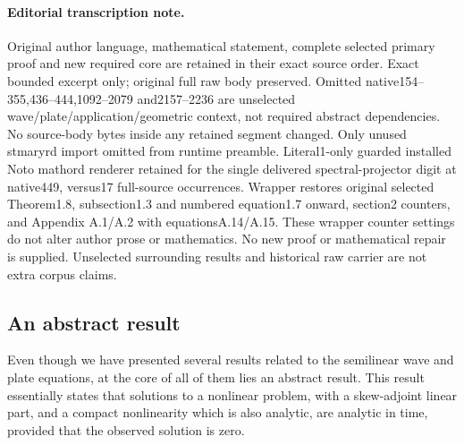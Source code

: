 \documentclass[11pt]{article}
\theoremstyle{definition}
\begin{document}
\paragraph{Editorial transcription note.}
Original author language, mathematical statement, complete selected primary proof and new required core are retained in their exact source order. Exact bounded excerpt only; original full raw body preserved. Omitted native154–355,436–444,1092–2079 and2157–2236 are unselected wave/plate/application/geometric context, not required abstract dependencies. No source-body bytes inside any retained segment changed. Only unused stmaryrd import omitted from runtime preamble. Literal1-only guarded installed Noto mathord renderer retained for the single delivered spectral-projector digit at native449, versus17 full-source occurrences. Wrapper restores original selected Theorem1.8, subsection1.3 and numbered equation1.7 onward, section2 counters, and Appendix A.1/A.2 with equationsA.14/A.15. These wrapper counter settings do not alter author prose or mathematics. No new proof or mathematical repair is supplied. Unselected surrounding results and historical raw carrier are not extra corpus claims.
\clearpage
{}
\setcounter{section}{1}\setcounter{subsection}{2}\setcounter{theorem}{7}\setcounter{equation}{6}

\subsection{An abstract result}\label{s:abstrIntro} Even though we have presented several results related to the semilinear wave and plate equations, at the core of all of them lies an abstract result. This result essentially states that solutions to a nonlinear problem, with a skew-adjoint linear part, and a compact nonlinearity which is also analytic, are analytic in time, provided that the observed solution is zero.
\end{document}
